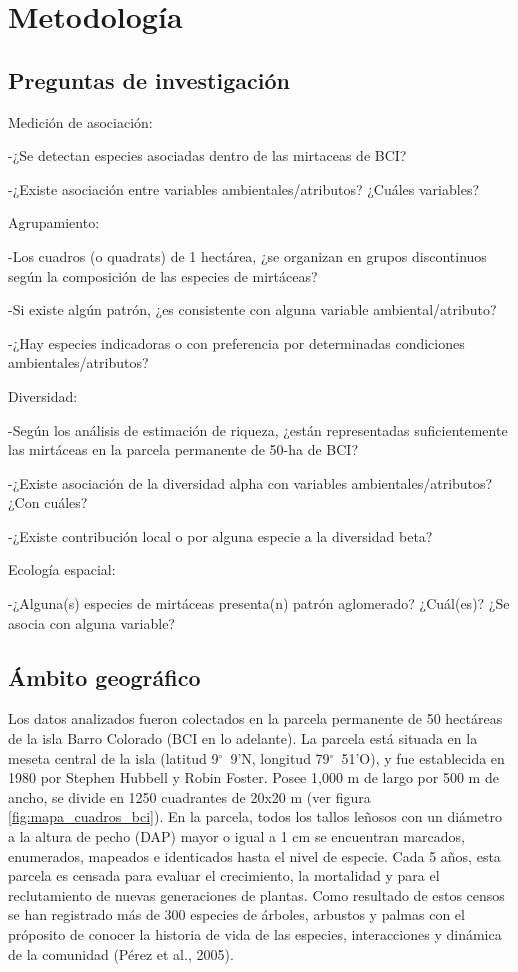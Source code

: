 \documentclass[11pt,]{article}
\begin{document}
\section{Metodología}\label{metodologuxeda}

\subsection{Preguntas de
investigación}\label{preguntas-de-investigaciuxf3n}

Medición de asociación:

-¿Se detectan especies asociadas dentro de las mirtaceas de BCI?

-¿Existe asociación entre variables ambientales/atributos? ¿Cuáles
variables?

Agrupamiento:

-Los cuadros (o quadrats) de 1 hectárea, ¿se organizan en grupos
discontinuos según la composición de las especies de mirtáceas?

-Si existe algún patrón, ¿es consistente con alguna variable
ambiental/atributo?

-¿Hay especies indicadoras o con preferencia por determinadas
condiciones ambientales/atributos?

Diversidad:

-Según los análisis de estimación de riqueza, ¿están representadas
suficientemente las mirtáceas en la parcela permanente de 50-ha de BCI?

-¿Existe asociación de la diversidad alpha con variables
ambientales/atributos? ¿Con cuáles?

-¿Existe contribución local o por alguna especie a la diversidad beta?

Ecología espacial:

-¿Alguna(s) especies de mirtáceas presenta(n) patrón aglomerado?
¿Cuál(es)? ¿Se asocia con alguna variable?

\subsection{Ámbito geográfico}\label{uxe1mbito-geogruxe1fico}

Los datos analizados fueron colectados en la parcela permanente de 50
hectáreas de la isla Barro Colorado (BCI en lo adelante). La parcela
está situada en la meseta central de la isla (latitud 9\(^\circ\)~9'N,
longitud 79\(^\circ\)~51'O), y fue establecida en 1980 por Stephen
Hubbell y Robin Foster. Posee 1,000 m de largo por 500 m de ancho, se
divide en 1250 cuadrantes de 20x20 m (ver figura
\ref{fig:mapa_cuadros_bci}). En la parcela, todos los tallos leñosos con
un diámetro a la altura de pecho (DAP) mayor o igual a 1 cm se
encuentran marcados, enumerados, mapeados e identicados hasta el nivel
de especie. Cada 5 años, esta parcela es censada para evaluar el
crecimiento, la mortalidad y para el reclutamiento de nuevas
generaciones de plantas. Como resultado de estos censos se han
registrado más de 300 especies de árboles, arbustos y palmas con el
próposito de conocer la historia de vida de las especies, interacciones
y dinámica de la comunidad (Pérez et al., 2005).
\end{document}
